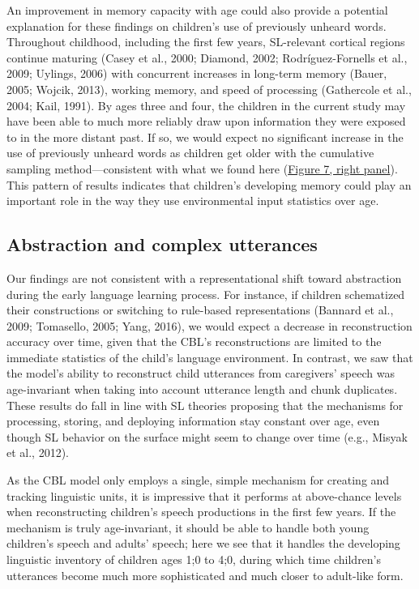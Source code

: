 \documentclass[
  english,
  man,floatsintext]{apa6}
\begin{document}
An improvement in memory capacity with age could also provide a potential explanation for these findings on children's use of previously unheard words. Throughout childhood, including the first few years, SL-relevant cortical regions continue maturing (Casey et al., 2000; Diamond, 2002; Rodríguez-Fornells et al., 2009; Uylings, 2006) with concurrent increases in long-term memory (Bauer, 2005; Wojcik, 2013), working memory, and speed of processing (Gathercole et al., 2004; Kail, 1991). By ages three and four, the children in the current study may have been able to much more reliably draw upon information they were exposed to in the more distant past. If so, we would expect no significant increase in the use of previously unheard words as children get older with the cumulative sampling method---consistent with what we found here (\protect\hyperlink{fig7}{Figure 7, right panel}). This pattern of results indicates that children's developing memory could play an important role in the way they use environmental input statistics over age.

\hypertarget{abstraction-and-complex-utterances}{%
\subsection{Abstraction and complex utterances}\label{abstraction-and-complex-utterances}}

Our findings are not consistent with a representational shift toward abstraction during the early language learning process. For instance, if children schematized their constructions or switching to rule-based representations (Bannard et al., 2009; Tomasello, 2005; Yang, 2016), we would expect a decrease in reconstruction accuracy over time, given that the CBL's reconstructions are limited to the immediate statistics of the child's language environment. In contrast, we saw that the model's ability to reconstruct child utterances from caregivers' speech was age-invariant when taking into account utterance length and chunk duplicates. These results do fall in line with SL theories proposing that the mechanisms for processing, storing, and deploying information stay constant over age, even though SL behavior on the surface might seem to change over time (e.g., Misyak et al., 2012).

As the CBL model only employs a single, simple mechanism for creating and tracking linguistic units, it is impressive that it performs at above-chance levels when reconstructing children's speech productions in the first few years. If the mechanism is truly age-invariant, it should be able to handle both young children's speech and adults' speech; here we see that it handles the developing linguistic inventory of children ages 1;0 to 4;0, during which time children's utterances become much more sophisticated and much closer to adult-like form.
\end{document}

